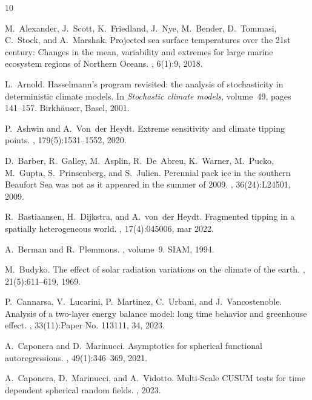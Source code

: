 \documentclass[10pt]{amsart}
\numberwithin{equation}{section}
\begin{document}
\begin{thebibliography}{10}

M.~Alexander, J.~Scott, K.~Friedland, J.~Nye, M.~Bender, D.~Tommasi, C.~Stock,
  and A.~Marshak.
\newblock Projected sea surface temperatures over the 21st century: {C}hanges
  in the mean, variability and extremes for large marine ecosystem regions of
  {N}orthern {O}ceans.
, 6(1):9, 2018.

L.~Arnold.
\newblock Hasselmann's program revisited: the analysis of stochasticity in
  deterministic climate models.
\newblock In {\em Stochastic climate models}, volume~49, pages 141--157.
  Birkh\"{a}user, Basel, 2001.

P.~Ashwin and A.~Von~der Heydt.
\newblock Extreme sensitivity and climate tipping points.
, 179(5):1531--1552, 2020.

D.~Barber, R.~Galley, M.~Asplin, R.~De~Abreu, K.~Warner, M.~Pucko, M.~Gupta,
  S.~Prinsenberg, and S.~Julien.
\newblock Perennial pack ice in the southern {B}eaufort {S}ea was not as it
  appeared in the summer of 2009.
, 36(24):L24501, 2009.

R.~Bastiaansen, H.~Dijkstra, and A.~von~der Heydt.
\newblock Fragmented tipping in a spatially heterogeneous world.
, 17(4):045006, mar 2022.

A.~Berman and R.~Plemmons.
, volume~9.
\newblock SIAM, 1994.

M.~Budyko.
\newblock The effect of solar radiation variations on the climate of the earth.
, 21(5):611--619, 1969.

P.~Cannarsa, V.~Lucarini, P.~Martinez, C.~Urbani, and J.~Vancostenoble.
\newblock Analysis of a two-layer energy balance model: long time behavior and
  greenhouse effect.
, 33(11):Paper No. 113111, 34, 2023.

A.~Caponera and D.~Marinucci.
\newblock Asymptotics for spherical functional autoregressions.
, 49(1):346--369, 2021.

A.~Caponera, D.~Marinucci, and A.~Vidotto.
\newblock Multi-{S}cale {CUSUM} tests for time dependent spherical random
  fields.
, 2023.


\end{thebibliography}
\end{document}
